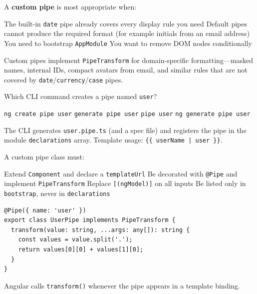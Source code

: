 \question[4]
A \textbf{custom pipe} is most appropriate when:
\begin{choices}
  \choice The built-in \lstinline[style=htmlinline]|date| pipe already covers every display rule you need
  \CorrectChoice Default pipes cannot produce the required format (for example initials from an email address)
  \choice You need to bootstrap \texttt{AppModule}
  \choice You want to remove DOM nodes conditionally
\end{choices}
\begin{solution}
  Custom pipes implement \lstinline[style=tsinline]|PipeTransform| for domain-specific formatting---masked names, internal IDs, compact avatars from email, and similar rules that are not covered by \lstinline[style=htmlinline]|date|/\lstinline[style=htmlinline]|currency|/\lstinline[style=htmlinline]|case| pipes.
\end{solution}

\question[4]
Which CLI command creates a pipe named \texttt{user}?
\begin{choices}
  \choice \texttt{ng create pipe user}
  \choice \texttt{generate pipe user}
  \choice \texttt{pipe user}
  \CorrectChoice \texttt{ng generate pipe user}
\end{choices}
\begin{solution}
  The CLI generates \texttt{user.pipe.ts} (and a spec file) and registers the pipe in the module \texttt{declarations} array. Template usage: \lstinline[style=htmlinline]!{{ userName | user }}!.
\end{solution}

\question[4]
A custom pipe class must:
\begin{choices}
  \choice Extend \texttt{Component} and declare a \texttt{templateUrl}
  \CorrectChoice Be decorated with \lstinline[style=tsinline]|@Pipe| and implement \lstinline[style=tsinline]|PipeTransform|
  \choice Replace \lstinline[style=htmlinline]|[(ngModel)]| on all inputs
  \choice Be listed only in \texttt{bootstrap}, never in \texttt{declarations}
\end{choices}
\begin{solution}
\begin{lstlisting}[style=ts]
@Pipe({ name: 'user' })
export class UserPipe implements PipeTransform {
  transform(value: string, ...args: any[]): string {
    const values = value.split('.');
    return values[0][0] + values[1][0];
  }
}
\end{lstlisting}
  Angular calls \lstinline[style=tsinline]|transform()| whenever the pipe appears in a template binding.
\end{solution}

